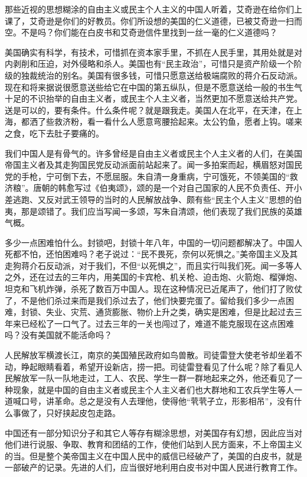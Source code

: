那些近视的思想糊涂的自由主义或民主个人主义的中国人听着，艾奇逊在给你们上课了，艾奇逊是你们的好教员。你们所设想的美国的仁义道德，已被艾奇逊一扫而空。不是吗？你们能在白皮书和艾奇逊信件里找到一丝一毫的仁义道德吗？

美国确实有科学，有技术，可惜抓在资本家手里，不抓在人民手里，其用处就是对内剥削和压迫，对外侵略和杀人。美国也有“民主政治”，可惜只是资产阶级一个阶级的独裁统治的别名。美国有很多钱，可惜只愿意送给极端腐败的蒋介石反动派。现在和将来据说很愿意送些给它在中国的第五纵队，但是不愿意送给一般的书生气十足的不识抬举的自由主义者，或民主个人主义者，当然更加不愿意送给共产党。送是可以的，要有条件。什么条件呢？就是跟我走。美国人在北平，在天津，在上海，都洒了些救济粉，看一看什么人愿意弯腰拾起来。太公钓鱼，愿者上钩。嗟来之食，吃下去肚子要痛的。

我们中国人是有骨气的。许多曾经是自由主义者或民主个人主义者的人们，在美国帝国主义者及其走狗国民党反动派面前站起来了。闻一多拍案而起，横眉怒对国民党的手枪，宁可倒下去，不愿屈服。朱自清一身重病，宁可饿死，不领美国的“救济粮”。唐朝的韩愈写过《伯夷颂》，颂的是一个对自己国家的人民不负责任、开小差逃跑、又反对武王领导的当时的人民解放战争、颇有些“民主个人主义”思想的伯夷，那是颂错了。我们应当写闻一多颂，写朱自清颂，他们表现了我们民族的英雄气概。

多少一点困难怕什么。封锁吧，封锁十年八年，中国的一切问题都解决了。中国人死都不怕，还怕困难吗？老子说过：“民不畏死，奈何以死惧之。”美帝国主义及其走狗蒋介石反动派，对于我们，不但“以死惧之”，而且实行叫我们死。闻一多等人之外，还在过去的三年内，用美国的卡宾枪、机关枪、迫击炮、火箭炮、榴弹炮、坦克和飞机炸弹，杀死了数百万中国人。现在这种情况已近尾声了，他们打了败仗了，不是他们杀过来而是我们杀过去了，他们快要完蛋了。留给我们多少一点困难，封锁、失业、灾荒、通货膨胀、物价上升之类，确实是困难，但是比起过去三年来已经松了一口气了。过去三年的一关也闯过了，难道不能克服现在这点困难吗？没有美国就不能活命吗？

人民解放军横渡长江，南京的美国殖民政府如鸟兽散。司徒雷登大使老爷却坐着不动，睁起眼睛看着，希望开设新店，捞一把。司徒雷登看见了什么呢？除了看见人民解放军一队一队地走过，工人、农民、学生一群一群地起来之外，他还看见了一种现象，就是中国的自由主义者或民主个人主义者们也大群地和工农兵学生等人一道喊口号，讲革命。总之是没有人去理他，使得他“茕茕孑立，形影相吊”，没有什么事做了，只好挟起皮包走路。

中国还有一部分知识分子和其它人等存有糊涂思想，对美国存有幻想，因此应当对他们进行说服、争取、教育和团结的工作，使他们站到人民方面来，不上帝国主义的当。但是整个美帝国主义在中国人民中的威信已经破产了，美国的白皮书，就是一部破产的记录。先进的人们，应当很好地利用白皮书对中国人民进行教育工作。

